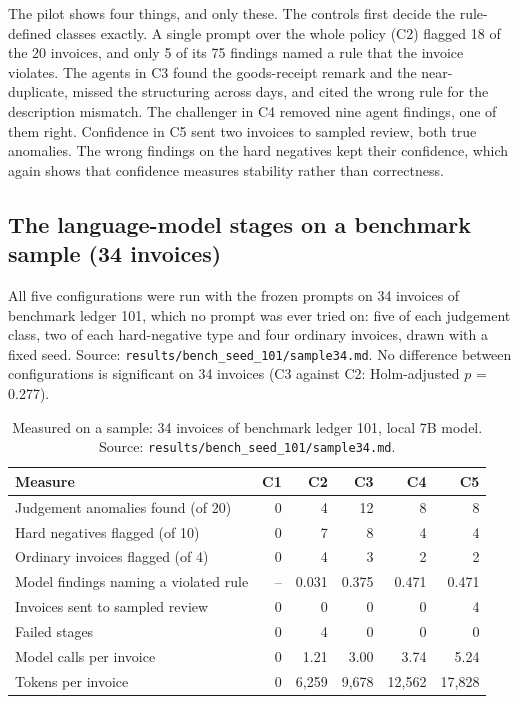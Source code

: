 \documentclass[11pt,a4paper]{article}
\begin{document}
The pilot shows four things, and only these. The controls first decide the rule-defined classes exactly. A single prompt over the whole policy (C2) flagged 18 of the 20 invoices, and only 5 of its 75 findings named a rule that the invoice violates. The agents in C3 found the goods-receipt remark and the near-duplicate, missed the structuring across days, and cited the wrong rule for the description mismatch. The challenger in C4 removed nine agent findings, one of them right. Confidence in C5 sent two invoices to sampled review, both true anomalies. The wrong findings on the hard negatives kept their confidence, which again shows that confidence measures stability rather than correctness.

\subsection{The language-model stages on a benchmark sample (34 invoices)}
\label{sec:sample}
All five configurations were run with the frozen prompts on 34 invoices of benchmark ledger 101, which no prompt was ever tried on: five of each judgement class, two of each hard-negative type and four ordinary invoices, drawn with a fixed seed. Source: \texttt{results/bench\_seed\_101/sample34.md}. No difference between configurations is significant on 34 invoices (C3 against C2: Holm-adjusted $p$ = 0.277).

\begin{table}[htbp]
\caption{Measured on a sample: 34 invoices of benchmark ledger 101, local 7B model. Source: \texttt{results/bench\_seed\_101/sample34.md}.}
\label{tab:sample}
\centering
\small
\begin{tabular}{L{6.0cm}rrrrr}
\toprule
Measure & C1 & C2 & C3 & C4 & C5 \\
\midrule
Judgement anomalies found (of 20) & 0 & 4 & 12 & 8 & 8 \\
Hard negatives flagged (of 10) & 0 & 7 & 8 & 4 & 4 \\
Ordinary invoices flagged (of 4) & 0 & 4 & 3 & 2 & 2 \\
Model findings naming a violated rule & -- & 0.031 & 0.375 & 0.471 & 0.471 \\
Invoices sent to sampled review & 0 & 0 & 0 & 0 & 4 \\
Failed stages & 0 & 4 & 0 & 0 & 0 \\
Model calls per invoice & 0 & 1.21 & 3.00 & 3.74 & 5.24 \\
Tokens per invoice & 0 & 6,259 & 9,678 & 12,562 & 17,828 \\
\bottomrule
\end{tabular}
\end{table}
\end{document}
